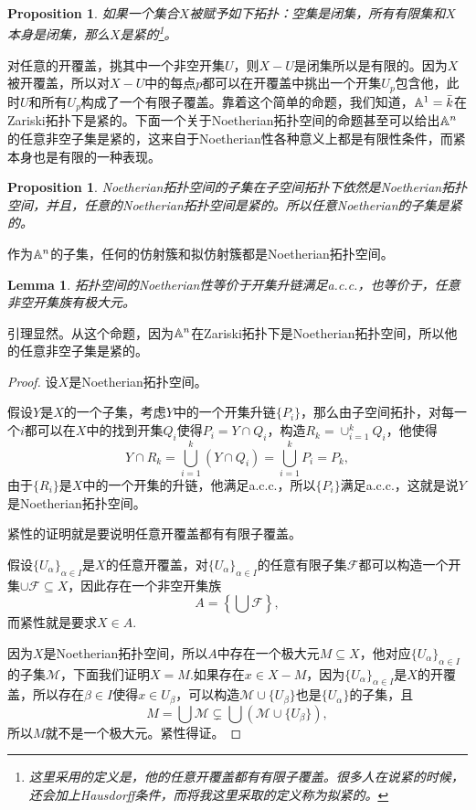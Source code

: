 \documentclass[9pt]{extarticle}
\theoremstyle{plain}%
\newtheorem{pro}[defi]{Proposition}%
\newtheorem{lem}[defi]{Lemma}%
\begin{document}
\begin{pro}
如果一个集合$X$被赋予如下拓扑：空集是闭集，所有有限集和$X$本身是闭集，那么$X$是紧的\footnote{这里采用的定义是，他的任意开覆盖都有有限子覆盖。很多人在说紧的时候，还会加上Hausdorff条件，而将我这里采取的定义称为拟紧的。}。
\end{pro}
对任意的开覆盖，挑其中一个非空开集$U$，则$X-U$是闭集所以是有限的。因为$X$被开覆盖，所以对$X-U$中的每点$p$都可以在开覆盖中挑出一个开集$U_p$包含他，此时$U$和所有$U_p$构成了一个有限子覆盖。靠着这个简单的命题，我们知道，$\mathbb{A}^1=\bar{k}$在Zariski拓扑下是紧的。下面一个关于Noetherian拓扑空间的命题甚至可以给出$\mathbb{A}^n$的任意非空子集是紧的，这来自于Noetherian性各种意义上都是有限性条件，而紧本身也是有限的一种表现。
\begin{pro}
	Noetherian拓扑空间的子集在子空间拓扑下依然是Noetherian拓扑空间，并且，任意的Noetherian拓扑空间是紧的。所以任意Noetherian的子集是紧的。
\end{pro}
作为$\mathbb{A}^n$的子集，任何的仿射簇和拟仿射簇都是Noetherian拓扑空间。
\begin{lem}
	拓扑空间的Noetherian性等价于开集升链满足a.c.c.，也等价于，任意非空开集族有极大元。
\end{lem}
引理显然。从这个命题，因为$\mathbb{A}^n$在Zariski拓扑下是Noetherian拓扑空间，所以他的任意非空子集是紧的。
\begin{proof}
	设$X$是Noetherian拓扑空间。

	假设$Y$是$X$的一个子集，考虑$Y$中的一个开集升链$\{P_i\}$，那么由子空间拓扑，对每一个$i$都可以在$X$中的找到开集$Q_i$使得$P_i=Y\cap Q_i$，构造$R_k=\cup_{i=1}^k Q_i$，他使得
	\[
	Y\cap R_k=\bigcup_{i=1}^k (Y \cap Q_i)=\bigcup_{i=1}^k P_i=P_k,
	\]
	由于$\{R_i\}$是$X$中的一个开集的升链，他满足a.c.c.，所以$\{P_i\}$满足a.c.c.，这就是说$Y$是Noetherian拓扑空间。

	紧性的证明就是要说明任意开覆盖都有有限子覆盖。

	假设$\{U_\alpha\}_{\alpha\in I}$是$X$的任意开覆盖，对$\{U_\alpha\}_{\alpha\in I}$的任意有限子集$\mathscr{F}$都可以构造一个开集$\cup \mathscr{F}\subseteq X$，因此存在一个非空开集族
	\[
		A=\left\{\bigcup \mathscr{F}\right\},
	\]
	而紧性就是要求$X\in A$.

	因为$X$是Noetherian拓扑空间，所以$A$中存在一个极大元$M\subseteq X$，他对应$\{U_\alpha\}_{\alpha\in I}$的子集$\mathscr{M}$，下面我们证明$X=M$.如果存在$x\in X-M$，因为$\{U_\alpha\}_{\alpha\in I}$是$X$的开覆盖，所以存在$\beta \in I$使得$x\in U_\beta$，可以构造$\mathscr{M}\cup\{U_\beta\}$也是$\{U_\alpha\}$的子集，且
	\[
		M=\bigcup \mathscr{M}\subsetneq \bigcup\left(\mathscr{M}\cup\{U_\beta\}\right),
	\]
	所以$M$就不是一个极大元。紧性得证。
\end{proof}
\end{document}

